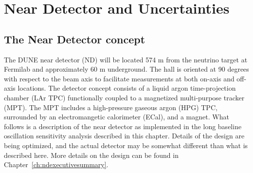 \section{Near Detector and Uncertainties}\label{sec:nu-osc-06}\label{sec:physics-lbnosc-ND}





\subsection{The Near Detector concept}
\label{sec:ndconcept}

The DUNE near detector (ND) will be located 574 m from the neutrino target at Fermilab and approximately 60 m underground. The hall is oriented at 90 degrees with respect to the beam axis to facilitate measurements at both on-axis and off-axis locations. The detector concept consists of a liquid argon time-projection chamber (LAr TPC) functionally coupled to a magnetized multi-purpose tracker (MPT). The MPT includes a high-pressure gaseous argon (HPG) TPC, surrounded by an electromangetic calorimeter (ECal), and a magnet. What follows is a description of the near detector as implemented in the long baseline oscillation sensitivity analysis described in this chapter. Details of the design are being optimized, and the actual detector may be somewhat different than what is described here. More details on the design can be found in Chapter~\ref{ch:ndexecutivesummary}.

